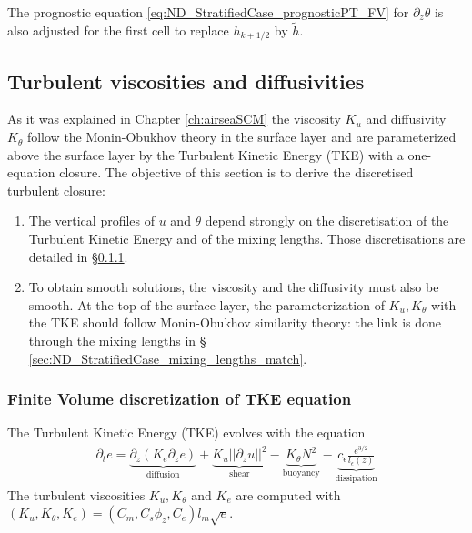 The prognostic equation \eqref{eq:ND_StratifiedCase_prognosticPT_FV}
for $\partial_z \theta$ is also adjusted for the first
cell to replace $h_{k+1/2}$ by $\widetilde{h}$.
\subsection{Turbulent viscosities and diffusivities}
\label{sec:ND_StratifiedCase_turbulentVisc}
As it was explained in Chapter \ref{ch:airseaSCM} the
viscosity $K_u$ and diffusivity $K_\theta$ follow the
Monin-Obukhov theory in the surface layer and are parameterized
above the surface layer by the Turbulent Kinetic Energy (TKE) with a
one-equation closure.
The objective of this section is to derive the discretised
turbulent closure:
\begin{enumerate}
\item
The vertical profiles of $u$ and $\theta$ depend strongly on
the discretisation of the Turbulent Kinetic Energy
and of the mixing lengths. Those discretisations are detailed in
\S \ref{sec:ND_StratifiedCase_TKE}.
\item To obtain smooth solutions, the viscosity and
the diffusivity must also be smooth.
At the top of the surface layer, the parameterization
of $K_u, K_\theta$ with the TKE should follow Monin-Obukhov
similarity theory:
the link is done through the mixing lengths in \S
\ref{sec:ND_StratifiedCase_mixing_lengths_match}.
\end{enumerate}
\subsubsection{Finite Volume discretization of TKE equation}
\label{sec:ND_StratifiedCase_TKE}
The Turbulent Kinetic Energy (TKE) evolves with the equation
\begin{equation}
\label{eq:ND_StratifiedCase_TKE}
    \begin{aligned}
    \partial_t e =
    \underbrace{\partial_z \left(K_e
    \partial_z e\right)}_{\text{diffusion}}
    + \underbrace{K_u ||\partial_z u||^2}_{\text{shear}} 
    - \underbrace{K_{\theta} N^2 }_{\text{buoyancy}}
    - \underbrace{c_{\epsilon}
    \frac{e^{3/2}}{l_{\epsilon}(z)}}_{\text{dissipation}}
    \end{aligned}
\end{equation}
The turbulent viscosities $K_u, K_{\theta}$ and $K_e$ are computed
with $(K_u, K_\theta, K_e) = (C_m , C_s \phi_z, C_e)l_m \sqrt{e}$.
